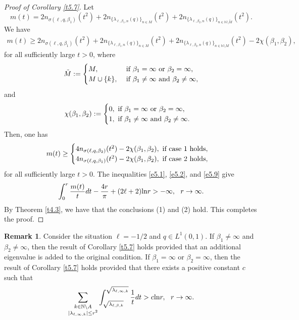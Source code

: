 \documentclass[reqno,12pt,centertags]{amsart}
\renewcommand{\ln}{\text{\rm ln}}
\numberwithin{equation}{section}
\theoremstyle{definition}
\newtheorem{remark}{Remark}[section]
\begin{document}
\begin{proof}[Proof of Corollary \ref{t5.7}]
Let 
$$m(t)=2n_{\sigma(\ell, q, \beta_1)}(t^2)+2n_{\{\lambda_{\ell, \beta_{1}, n}(q)\}_{n\in M}}(t^2)+2n_{\{\lambda_{\ell,\beta_{2}, n}(q)\}_{n\in\mathbb{N}\setminus \tilde{M}}}(t^2).$$
We have 
\begin{align*}
m(t)\geq2n_{\sigma(\ell, q, \beta_1)}(t^2)+2n_{\{\lambda_{\ell, \beta_{1}, n}(q)\}_{n\in M}}(t^2)+2n_{\{\lambda_{\ell,\beta_{2}, n}(q)\}_{n\in\mathbb{N}\setminus M}}(t^2)-2\chi(\beta_{1},\beta_{2}),
\end{align*}
for all sufficiently large $t>0$,
where
\begin{align*}
\tilde{M}:=
\begin{cases}
M,
&~\textnormal{if}~\beta_{1}=\infty~\textnormal{or}~\beta_{2}=\infty,\\
M\cup\{k\},
&~\textnormal{if}~\beta_{1}\neq\infty~\textnormal{and}~\beta_{2}\neq\infty,
\end{cases}
\end{align*}
and
\begin{align}\label{e5.17}
\chi(\beta_{1},\beta_{2}):=
\begin{cases}
0,
~\textnormal{if}~\beta_{1}=\infty~\textnormal{or}~\beta_{2}=\infty,\\
1,
~\textnormal{if}~\beta_{1}\neq\infty~\textnormal{and}~\beta_{2}\neq\infty.
\end{cases}
\end{align}
Then, one has 
\begin{align}\label{e5.9}
m(t)\geq 
\begin{cases}
4n_{\sigma(\ell, q, \beta_2)}(t^2)-2\chi(\beta_{1},\beta_{2}),
~\textnormal{if~case~1~holds},\\
4n_{\sigma(\ell, q, \beta_1)}(t^2)-2\chi(\beta_{1},\beta_{2}),
~\textnormal{if~case~2~holds},
\end{cases}
\end{align}
for all sufficiently large $t>0$. The inequalities \eqref{e5.1}, \eqref{e5.2}, and \eqref{e5.9} give  
\begin{align*}
\int_{0}^{r}\frac{m(t)}{t}dt
-\frac{4r}{\pi}
+(2\ell+2)\ln r 
 >-\infty, 
~~r\rightarrow\infty.
\end{align*}
By Theorem \ref{t4.3}, we have  that the conclusions (1) and (2) hold.
This completes the proof.
\end{proof}

\begin{remark}\label{r5.4}
Consider the situation $\ell=-1/2$ and $q \in L^{1}(0,1)$. If $\beta_{1}\neq\infty$ and $\beta_{2}\neq\infty$, 
then the result of Corollary \ref{t5.7} holds provided that an additional eigenvalue is added to the original condition.
If $\beta_{1}=\infty$ or $\beta_{2}=\infty$, 
then the result of Corollary \ref{t5.7} holds provided that there exists a positive constant $c$ such that 
\begin{align*}
\sum_{\substack{k \in \mathbb{N}\setminus A \\ |\lambda_{\ell, \infty, k}|\leq r^{2}}} 
\int_{\sqrt{\lambda_{\ell,\beta,k}}}^{\sqrt{\lambda_{\ell, \infty, k}}}
\frac{1}{t}dt>c\ln r, 
~~r\rightarrow\infty.
\end{align*}
\end{remark}
\end{document}
